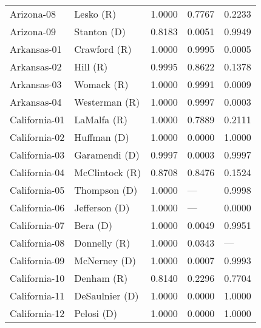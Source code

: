 \begin{longtable}{llrll}
        Arizona-08 &            {\color{Red} Lesko (R)} &       1.0000 &        0.7767 &        0.2233 \\
        Arizona-09 &         {\color{Blue} Stanton (D)} &       0.8183 &        0.0051 &        0.9949 \\
       Arkansas-01 &         {\color{Red} Crawford (R)} &       1.0000 &        0.9995 &        0.0005 \\
       Arkansas-02 &             {\color{Red} Hill (R)} &       0.9995 &        0.8622 &        0.1378 \\
       Arkansas-03 &           {\color{Red} Womack (R)} &       1.0000 &        0.9991 &        0.0009 \\
       Arkansas-04 &        {\color{Red} Westerman (R)} &       1.0000 &        0.9997 &        0.0003 \\
     California-01 &          {\color{Red} LaMalfa (R)} &       1.0000 &        0.7889 &        0.2111 \\
     California-02 &         {\color{Blue} Huffman (D)} &       1.0000 &        0.0000 &        1.0000 \\
     California-03 &       {\color{Blue} Garamendi (D)} &       0.9997 &        0.0003 &        0.9997 \\
     California-04 &       {\color{Red} McClintock (R)} &       0.8708 &        0.8476 &        0.1524 \\
     California-05 &        {\color{Blue} Thompson (D)} &       1.0000 &           --- &        0.9998 \\
     California-06 &       {\color{Blue} Jefferson (D)} &       1.0000 &           --- &        0.0000 \\
     California-07 &            {\color{Blue} Bera (D)} &       1.0000 &        0.0049 &        0.9951 \\
     California-08 &         {\color{Red} Donnelly (R)} &       1.0000 &        0.0343 &           --- \\
     California-09 &        {\color{Blue} McNerney (D)} &       1.0000 &        0.0007 &        0.9993 \\
     California-10 &           {\color{Red} Denham (R)} &       0.8140 &        0.2296 &        0.7704 \\
     California-11 &      {\color{Blue} DeSaulnier (D)} &       1.0000 &        0.0000 &        1.0000 \\
     California-12 &          {\color{Blue} Pelosi (D)} &       1.0000 &        0.0000 &        1.0000 \\

\end{longtable}
